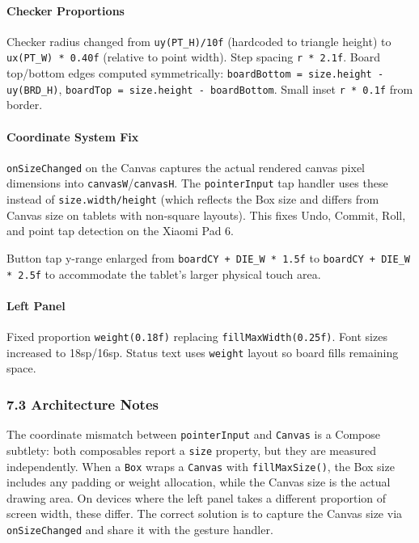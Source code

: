 \documentclass[11pt,a4paper]{article}
\begin{document}
\paragraph{Checker Proportions}

Checker radius changed from \texttt{uy(PT\_H)/10f} (hardcoded to
triangle height) to \texttt{ux(PT\_W) * 0.40f} (relative to point
width). Step spacing \texttt{r * 2.1f}. Board top/bottom edges
computed symmetrically: \texttt{boardBottom = size.height - uy(BRD\_H)},
\texttt{boardTop = size.height - boardBottom}. Small inset
\texttt{r * 0.1f} from border.

\paragraph{Coordinate System Fix}

\texttt{onSizeChanged} on the Canvas captures the actual rendered canvas
pixel dimensions into \texttt{canvasW}/\texttt{canvasH}. The
\texttt{pointerInput} tap handler uses these instead of
\texttt{size.width/height} (which reflects the Box size and differs
from Canvas size on tablets with non-square layouts). This fixes Undo,
Commit, Roll, and point tap detection on the Xiaomi Pad 6.

Button tap y-range enlarged from \texttt{boardCY + DIE\_W * 1.5f} to
\texttt{boardCY + DIE\_W * 2.5f} to accommodate the tablet's larger
physical touch area.

\paragraph{Left Panel}

Fixed proportion \texttt{weight(0.18f)} replacing
\texttt{fillMaxWidth(0.25f)}. Font sizes increased to 18sp/16sp.
Status text uses \texttt{weight} layout so board fills remaining space.

\subsubsection{7.3 Architecture Notes}\label{arch-v087}

The coordinate mismatch between \texttt{pointerInput} and
\texttt{Canvas} is a Compose subtlety: both composables report a
\texttt{size} property, but they are measured independently. When a
\texttt{Box} wraps a \texttt{Canvas} with \texttt{fillMaxSize()}, the
Box size includes any padding or weight allocation, while the Canvas
size is the actual drawing area. On devices where the left panel takes
a different proportion of screen width, these differ. The correct
solution is to capture the Canvas size via \texttt{onSizeChanged} and
share it with the gesture handler.
\end{document}
